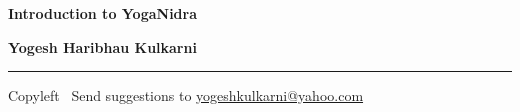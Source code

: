 
\usepackage{polyglossia}
\setdefaultlanguage{sanskrit}

\usepackage{fontspec}
\setmainfont{Segoe UI}

\newfontfamily{}
\newfontfamily{}
\newfontfamily{}
\newfontfamily{}


\graphicspath{{images/}}



\footnotesize


\begin{center}
\Large{\textbf{Introduction to YogaNidra}}  

\small{\textbf{Yogesh Haribhau Kulkarni}}  
\end{center}

\begin{multicols}{2}

\end{multicols}

\rule{\linewidth}{0.25pt}
\scriptsize
Copyleft \textcopyleft\  Send suggestions to 
\href{http://www.yogeshkulkarni.com}{yogeshkulkarni@yahoo.com}


